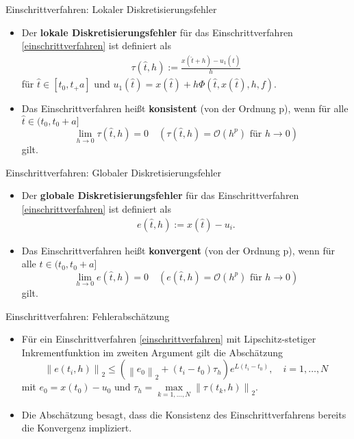 \begin{frame}{Einschrittverfahren: Lokaler Diskretisierungsfehler}
    \begin{itemize}
        \item<1-> Der \textbf{lokale Diskretisierungsfehler} für das Einschrittverfahren \eqref{einschrittverfahren} ist
        definiert als
        \begin{align}
            \label{lokaler-fehler}
            \tau(\hat{t},h) := \frac{x(\hat{t} + h)-u_1(\hat{t})}{h}
        \end{align}
        für $\hat{t} \in [t_0, t_+a]$ und $u_1(\hat{t})=x(\hat{t})+h\Phi(\hat{t},x(\hat{t}),h,f)$.
        \item<2-> Das Einschrittverfahren heißt \textbf{konsistent} (von der Ordnung p), wenn für alle
        $\hat{t}\in(t_0,t_0+a]$
        \[
            \lim_{h \rightarrow 0 } \tau(\hat{t}, h)=0 \quad (\tau(\hat{t},h) = \mathcal{O}(h^p) \text{ für } h \rightarrow 0)
        \]
        gilt.
    \end{itemize}
\end{frame}

\begin{frame}{Einschrittverfahren: Globaler Diskretisierungsfehler}
    \begin{itemize}
        \item<1-> Der \textbf{globale Diskretisierungsfehler} für das Einschrittverfahren \eqref{einschrittverfahren} ist
        definiert als
        \begin{align}
            \label{globaler-fehler}
            e(\hat{t}, h) := x(\hat{t}) - u_i.
        \end{align}

        \item<2-> Das Einschrittverfahren heißt \textbf{konvergent} (von der Ordnung p), wenn für alle
        $\hat{t}\in(t_0,t_0+a]$
        \[
            \lim_{h \rightarrow 0 } e(\hat{t}, h)=0 \quad (e(\hat{t},h) = \mathcal{O}(h^p) \text{ für } h \rightarrow 0)
        \]
        gilt.
    \end{itemize}
\end{frame}

\begin{frame}{Einschrittverfahren: Fehlerabschätzung}
    \begin{itemize}
        \item<1-> Für ein Einschrittverfahren \eqref{einschrittverfahren} mit Lipschitz-stetiger Inkrementfunktion im
        zweiten Argument gilt die Abschätzung
        \[
            \left\lVert e(t_i,h) \right\rVert_2 \leq \left( \left\lVert e_0 \right\rVert_2 + (t_i-t_0)\tau_h \right)
            e^{L(t_i-t_0)}, \quad i = 1, \dots, N
        \]
        mit $e_0 = x(t_0)-u_0$ und $\tau_h= \max\limits_{k=1,\dots,N} \left\lVert \tau(t_k,h) \right\rVert_2 $.
        \item<2-> Die Abschätzung besagt, dass die Konsistenz des Einschrittverfahrens bereits die Konvergenz impliziert.
    \end{itemize}
\end{frame}


